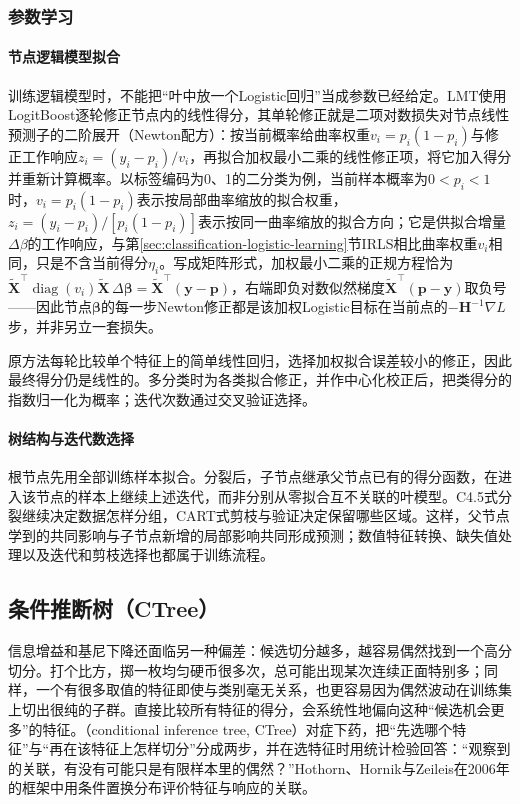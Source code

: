 \subsubsection{参数学习}

\paragraph{节点逻辑模型拟合}
训练逻辑模型时，不能把“叶中放一个Logistic回归”当成参数已经给定。LMT使用LogitBoost逐轮修正节点内的线性得分，其单轮修正就是二项对数损失对节点线性预测子的二阶展开（Newton配方）：按当前概率给曲率权重$v_i=p_i(1-p_i)$与修正工作响应$z_i=(y_i-p_i)/v_i$，再拟合加权最小二乘的线性修正项，将它加入得分并重新计算概率。以标签编码为0、1的二分类为例，当前样本概率为$0<p_i<1$时，$v_i=p_i(1-p_i)$表示按局部曲率缩放的拟合权重，$z_i=(y_i-p_i)/[p_i(1-p_i)]$表示按同一曲率缩放的拟合方向；它是供拟合增量$\Delta\beta$的工作响应，与第\ref{sec:classification-logistic-learning}节IRLS相比曲率权重$v_i$相同，只是不含当前得分$\eta_i$。写成矩阵形式，加权最小二乘的正规方程恰为$\tilde{\bm X}^{\top}\operatorname{diag}(v_i)\tilde{\bm X}\,\Delta\bm\beta=\tilde{\bm X}^{\top}(\bm y-\bm p)$，右端即负对数似然梯度$\tilde{\bm X}^{\top}(\bm p-\bm y)$取负号——因此节点$\bm\beta$的每一步Newton修正都是该加权Logistic目标在当前点的$-\bm H^{-1}\nabla L$步，并非另立一套损失。

原方法每轮比较单个特征上的简单线性回归，选择加权拟合误差较小的修正，因此最终得分仍是线性的。多分类时为各类拟合修正，并作中心化校正后，把类得分的指数归一化为概率；迭代次数通过交叉验证选择。

\paragraph{树结构与迭代数选择}
根节点先用全部训练样本拟合。分裂后，子节点继承父节点已有的得分函数，在进入该节点的样本上继续上述迭代，而非分别从零拟合互不关联的叶模型。C4.5式分裂继续决定数据怎样分组，CART式剪枝与验证决定保留哪些区域。这样，父节点学到的共同影响与子节点新增的局部影响共同形成预测；数值特征转换、缺失值处理以及迭代和剪枝选择也都属于训练流程。

\subsection{条件推断树（CTree）}
\label{sec:classification-ctree}

信息增益和基尼下降还面临另一种偏差：候选切分越多，越容易偶然找到一个高分切分。打个比方，掷一枚均匀硬币很多次，总可能出现某次连续正面特别多；同样，一个有很多取值的特征即使与类别毫无关系，也更容易因为偶然波动在训练集上切出很纯的子群。直接比较所有特征的得分，会系统性地偏向这种“候选机会更多”的特征。（conditional inference tree, CTree）对症下药，把“先选哪个特征”与“再在该特征上怎样切分”分成两步，并在选特征时用统计检验回答：“观察到的关联，有没有可能只是有限样本里的偶然？”Hothorn、Hornik与Zeileis在2006年的框架中用条件置换分布评价特征与响应的关联。

